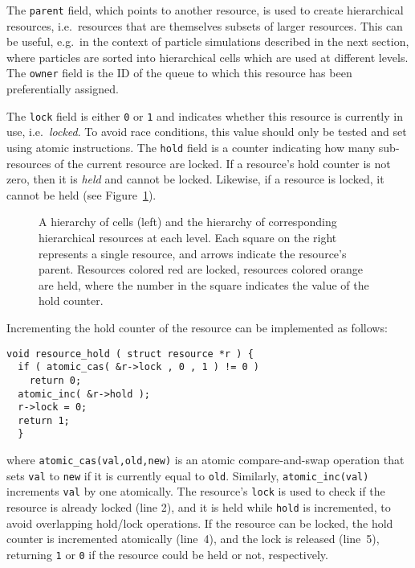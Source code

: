 \documentclass[preprint]{elsarticle}
\newcommand{\fig}[1]
    {Figure~\ref{fig:#1}}
\begin{document}
The {\tt parent} field, which points to another resource, is
used to create hierarchical resources, i.e.~resources
that are themselves subsets of larger resources.
This can be useful, e.g.~in the context of particle simulations
described in the next section, where particles are sorted
into hierarchical cells which are used at different levels.
The {\tt owner} field is the ID of the queue to which this
resource has been preferentially assigned.

The {\tt lock} field is either {\tt 0} or {\tt 1} and indicates
whether this resource is currently in use, i.e.~{\em locked}.
To avoid race conditions, this value should only be tested
and set using atomic instructions.
The {\tt hold} field is a counter indicating how many
sub-resources of the current resource are locked.
If a resource's hold counter is not zero, then it is
{\em held} and cannot be locked.
Likewise, if a resource is locked, it cannot be held
(see \fig{Resources}).

\begin{figure}
    \centerline{}
    \caption{A hierarchy of cells (left) and the hierarchy of
        corresponding hierarchical resources at each level.
        Each square on the right represents a single resource, and
        arrows indicate the resource's parent.
        Resources colored red are locked, resources colored orange
        are held, where the number in the square indicates the
        value of the hold counter.}
    \label{fig:Resources}
\end{figure}

Incrementing the hold counter of the resource can be implemented
as follows:
\begin{center}\begin{minipage}{0.9\textwidth}
    \begin{lstlisting}
void resource_hold ( struct resource *r ) {
  if ( atomic_cas( &r->lock , 0 , 1 ) != 0 )
    return 0;
  atomic_inc( &r->hold );
  r->lock = 0;
  return 1;
  }
    \end{lstlisting}
\end{minipage}\end{center}
\noindent where {\tt atomic\_cas(val,old,new)} is an atomic
compare-and-swap operation that sets {\tt val} to {\tt new}
if it is currently equal to {\tt old}.
Similarly, {\tt atomic\_inc(val)} increments {\tt val} by one
atomically.
The resource's {\tt lock} is used to check if the resource
is already locked (line 2), and it is held while {\tt hold}
is incremented, to avoid overlapping hold/lock operations.
If the resource can be locked, the hold counter is incremented
atomically (line~4), and the lock is released (line~5),
returning {\tt 1} or {\tt 0} if the resource could be held
or not, respectively.
\end{document}
